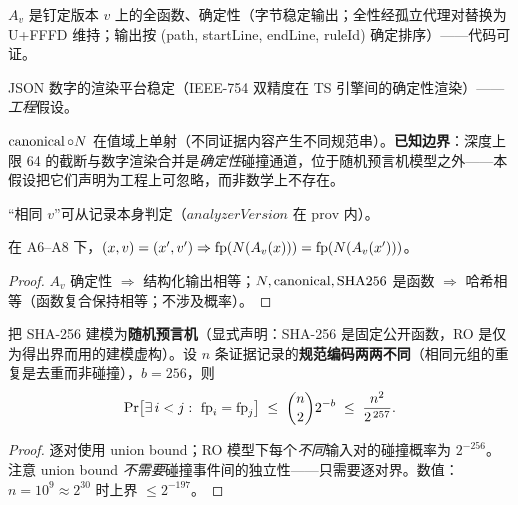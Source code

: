 \begin{assumptioninner}\label{ass:a6}
$A_v$ 是钉定版本 $v$ 上的全函数、确定性（字节稳定输出；全性经孤立代理对替换为 U+FFFD 维持；输出按 (path, startLine, endLine, ruleId) 确定排序）——代码可证。
\end{assumptioninner}
\begin{assumptioninner}[{规范序列化的确定性}]\label{ass:a7}
JSON 数字的渲染平台稳定（IEEE-754 双精度在 TS 引擎间的确定性渲染）——\emph{工程}假设。
\end{assumptioninner}
\begin{assumptioninner}[{规范化的单射性}]\label{ass:a7p}
$\operatorname{canonical}\circ N$ 在值域上单射（不同证据内容产生不同规范串）。\textbf{已知边界}：深度上限 64 的截断与数字渲染合并是\emph{确定性}碰撞通道，位于随机预言机模型之外——本假设把它们声明为工程上可忽略，而非数学上不存在。
\end{assumptioninner}
\begin{assumptioninner}[{版本可判定}]\label{ass:a8}
“相同 $v$”可从记录本身判定（$analyzerVersion$ 在 $\mathrm{prov}$ 内）。
\end{assumptioninner}

\begin{proposition}[确定性]\label{prop:determinism}
在 A6--A8 下，$(x,v)=(x',v')\Rightarrow \operatorname{fp}(N(A_v(x)))=\operatorname{fp}(N(A_v(x')))$。
\end{proposition}
\begin{proof}
$A_v$ 确定性 $\Rightarrow$ 结构化输出相等；$N,\operatorname{canonical},\mathrm{SHA256}$ 是函数 $\Rightarrow$ 哈希相等（函数复合保持相等；不涉及概率）。
\end{proof}

\begin{proposition}\label{prop:collision}
把 SHA-256 建模为\textbf{随机预言机}（显式声明：SHA-256 是固定公开函数，RO 是仅为得出界而用的建模虚构）。设 $n$ 条证据记录的\textbf{规范编码两两不同}（相同元组的重复是去重而非碰撞），$b=256$，则
\begin{equation}
\Pr\bigl[\exists\, i<j:\ \fp_i=\fp_j\bigr]\;\le\;\binom{n}{2}2^{-b}\;\le\;\frac{n^{2}}{2^{\,257}}.
\end{equation}
\end{proposition}
\begin{proof}
逐对使用 union bound；RO 模型下每个\emph{不同}输入对的碰撞概率为 $2^{-256}$。注意 union bound \emph{不需要}碰撞事件间的独立性——只需要逐对界。数值：$n=10^{9}\approx2^{30}$ 时上界 $\le 2^{-197}$。
\end{proof}

